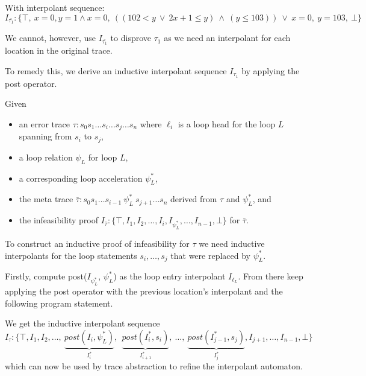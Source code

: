 \documentclass{article}
\newcommand{\loc}[1]{\ensuremath{\ell_{#1}}}
\newcounter{example}[section]
\newcommand\mycom[1]{}
\newcommand\mycom[1]{#1}
\newcommand{\dd}[1]{\mycom{\todo[color=orange!40,inline]{\small DD: #1}}}
\newcommand{\ts}[1]{\mycom{\todo[color=green!40,inline]{\small TS: #1}}}
\begin{document}
With interpolant sequence:
\begin{equation*}
	I_{\bar{\tau_1}}: \{ \top,\ x = 0, y = 1 \land x = 0,\ ((102 < y\ \lor \ 2x + 1 \leq y)\ \land\ (y \leq 103))\ \lor\ x = 0,\ y = 103,\ \bot \}
\end{equation*}
\dd{Do you still need the line above?}

We cannot, however, use $I_{\bar{\tau_1}}$ to disprove $\tau_1$ as we need an interpolant for each location in the original trace.
\dd{say which one is missing ;)}
To remedy this, we derive an inductive interpolant sequence $I_{\tau_1}$ by applying the post operator.
\dd{Explain why we need post for the before-location, use the example here}

\newcommand{\accels}[1]{\ensuremath{\psi^{*}_{#1}}}
Given
\begin{itemize}[topsep=0pt,itemsep=-1ex,partopsep=1ex,parsep=1ex]
	\item an error trace $\tau: s_0 s_1 \ldots s_i \ldots s_j \ldots s_n$ where \loc{i} is a loop head for the loop $L$ spanning from $s_i$ to $s_j$,
	\item a loop relation $\psi_L$ for loop $L$,
	\item a corresponding loop acceleration \accels{L},
	\item the meta trace $\bar{\tau}: s_0 s_1 \ldots s_{i-1} \ \accels{L} \ s_{j+1} \ldots s_n$ derived from $\tau$ and \accels{L}, and
	\item the infeasibility proof $I_{\bar{\tau}}: \{\top, I_1, I_2, \ldots , I_i, I_{\psi^*_{L}}, \ldots , I_{n-1}, \bot \}$ for $\bar{\tau}$.
\end{itemize}
\dd{Fix indices s.t. we have the interpolant (sic!) before and after the loop acceleration}

To construct an inductive proof of infeasibility for $\tau$ we need inductive interpolants for the loop statements $s_i, \ldots , s_j$ that were replaced by $\psi^*_{L}$.

Firstly, compute post($I_{\psi^*_L}$, $\psi^*_L$) as the loop entry interpolant $I_{\loc{L}}$.
From there keep applying the post operator with the previous location's interpolant and the following program statement.

We get the inductive interpolant sequence
\begin{equation*}
	I_\tau: \{\top,I_1,I_2, \ldots ,\ \underbrace{post(I_i, \accels{L})}_{I_{i}^*},\ \ \underbrace{post(I_{i}^*, s_i)}_{I_{i+1}^*},\ \ldots ,\ \underbrace{post(I_{j-1}^*, s_j)}_{I_{j}^*},I_{j+1}, \ldots ,I_{n-1}, \bot \}
\end{equation*}
which can now be used by trace abstraction to refine the interpolant automaton.
\ts{Explain why this works and why it is necessary.}
\end{document}
